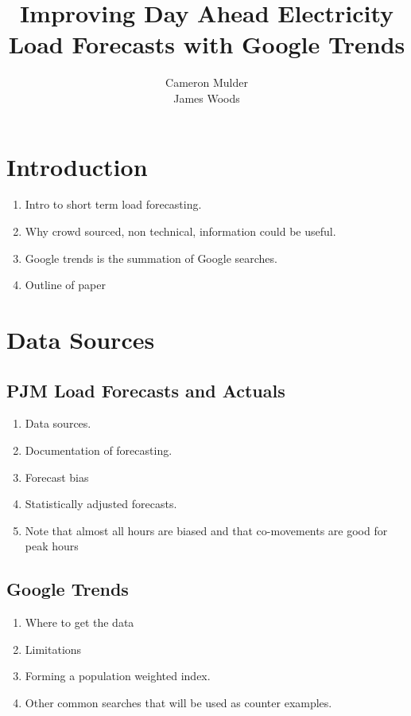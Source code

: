 \documentclass{article}
\title{Improving Day Ahead Electricity Load Forecasts with Google Trends}
\author{Cameron Mulder\\ James Woods}
\begin{document}
\maketitle
{}


\begin{abstract}

\end{abstract}



\section{Introduction}



\begin{enumerate}
  \item Intro to short term load forecasting.
  \item Why crowd sourced, non technical,  information could be useful.
  \item Google trends is the summation of Google searches.
  \item Outline of paper
\end{enumerate}


\section{Data Sources}

  \subsection{PJM Load Forecasts and Actuals}

    \begin{enumerate}
      \item Data sources.
      \item Documentation of forecasting.
      \item Forecast bias
      \item Statistically adjusted forecasts.
      \item Note that almost all hours are biased and that co-movements are good for peak hours
    \end{enumerate}

  \subsection{Google Trends}

    \begin{enumerate}
      \item Where to get the data
      \item Limitations
      \item Forming a population weighted index.
      \item Other common searches that will be used as counter examples.
    \end{enumerate}
\end{document}
